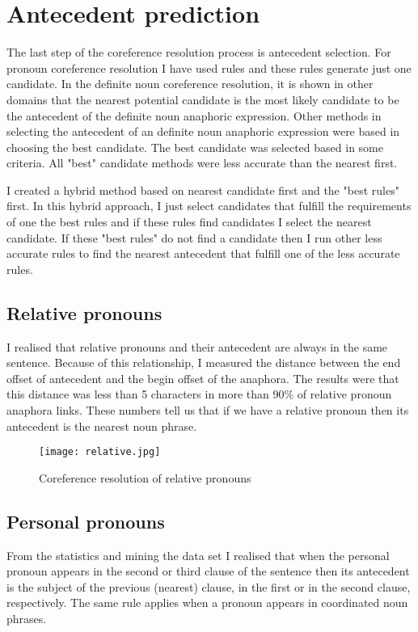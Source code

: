 \section{Antecedent prediction}
The last step of the coreference resolution process is antecedent selection. For pronoun coreference resolution I have used rules and these rules generate just one candidate. In the definite noun coreference resolution, it is shown in other domains that the nearest potential candidate is the most likely candidate to be the antecedent of the definite noun anaphoric expression. Other methods in selecting the antecedent of an definite noun anaphoric expression were based in choosing the best candidate. The best candidate was selected based in some criteria. All  "best" candidate methods were less accurate than the nearest first. 
 
I created a hybrid method based on nearest candidate first and the "best rules" first. In this hybrid approach, I just select candidates that fulfill the requirements of one the best rules and if these rules find candidates I select the nearest candidate. If these "best rules" do not find a candidate then I run other less accurate rules to find the nearest  antecedent that fulfill one of the less accurate rules.   

\subsection{Relative pronouns}
I realised that relative pronouns and their antecedent are always in the same sentence. Because of this relationship, I measured the distance between the end offset of antecedent and the begin offset of the anaphora. The results were that this distance was less than 5 characters in more than 90\% of relative pronoun anaphora links. These numbers tell us that if we have a relative pronoun then its antecedent is the nearest noun phrase.

\begin{figure}[h]
  \begin{center}
	 \texttt{[image: relative.jpg]} 
 	 \caption[Coreference resolution of relative pronouns]{Coreference resolution of relative pronouns}
	 \label{Figure 11}
  \end{center}
\end{figure}
 
\subsection{Personal pronouns} 
From the statistics and mining the data set I realised that when  the personal pronoun appears in the second or third clause of the sentence then its antecedent is the  subject of the previous (nearest) clause, in the first or in the second clause, respectively.  The same rule applies when a pronoun appears in coordinated noun phrases. 

